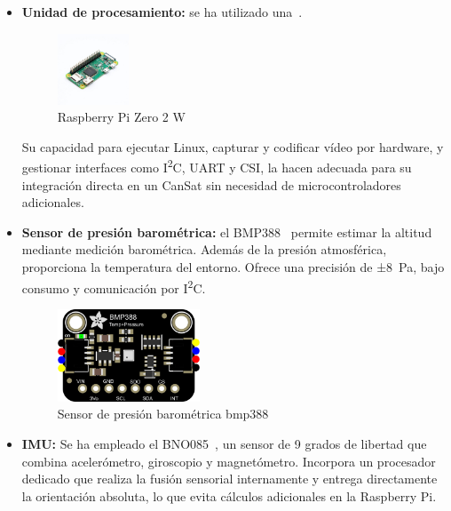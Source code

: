 \begin{itemize}
    \item \textbf{Unidad de procesamiento:} se ha utilizado una~\cite{raspberrypi_zero2}.

    \begin{figure}[H]
        \centering
        \includegraphics[width=0.2\textwidth]{Imagenes/Bitmap/ras2}
        \caption{Raspberry Pi Zero 2 W}
        \label{fig:ras2}
    \end{figure}

    Su capacidad para ejecutar Linux, capturar y codificar vídeo por hardware, y gestionar interfaces como I\textsuperscript{2}C, UART y CSI, la hacen adecuada para su integración directa en un CanSat sin necesidad de microcontroladores adicionales.
    \item \textbf{Sensor de presión barométrica:} el BMP388~\cite{adafruitBMP388} permite estimar la altitud mediante medición barométrica.
    Además de la presión atmosférica, proporciona la temperatura del entorno.
    Ofrece una precisión de ±8~Pa, bajo consumo y comunicación por I\textsuperscript{2}C.

    \begin{figure}[H]
        \centering
        \includegraphics[width=0.4\textwidth]{Imagenes/Bitmap/bmp388}
        \caption{Sensor de presión barométrica bmp388}
        \label{fig:bmp388}
    \end{figure}

    \item \textbf{IMU:} Se ha empleado el BNO085~\cite{adafruitBNO085}, un sensor de 9 grados de libertad que combina acelerómetro, giroscopio y magnetómetro.
    Incorpora un procesador dedicado que realiza la fusión sensorial internamente y entrega directamente la orientación absoluta, lo que evita cálculos adicionales en la Raspberry Pi.


\end{itemize}
